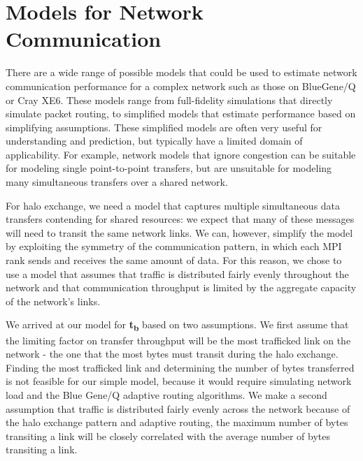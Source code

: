 \documentclass{acm_proc_article-sp}
\begin{document}
\section{Models for Network Communication}\label{model}


There are a wide range of possible models that could be used to
estimate network communication performance for a complex network
such as those on BlueGene/Q or Cray XE6.  These models range from
full-fidelity simulations that directly simulate packet routing, to
simplified models that estimate performance based on simplifying
assumptions.  These simplified models are often very useful for
understanding and prediction, but typically have a limited domain
of applicability.  For example, network models that ignore congestion
can be suitable for modeling single point-to-point transfers, but are
unsuitable for modeling many simultaneous transfers over a shared network.

For halo exchange, we need a model that captures multiple
simultaneous data transfers contending for shared resources: we
expect that many of these messages will need to transit the
same network links.  We can, however, simplify the model by exploiting the
symmetry of the communication pattern, in which each MPI rank sends
and receives the same amount of data. For this reason, we chose to
use a model that assumes that traffic is distributed fairly evenly
throughout the network and that communication throughput is limited
by the aggregate capacity of the network's links. 

We arrived at our model for \textbf{t\textsubscript{b}} based on two assumptions.
We first assume that the limiting factor on transfer throughput will be
the most trafficked link on the network - the one that the most bytes
must transit during the halo exchange.  Finding the most trafficked
link and determining the number of bytes transferred is not feasible for our
simple model, because it would require simulating network load and
the Blue Gene/Q adaptive routing algorithms. We make a second assumption
that traffic is distributed fairly evenly across the network because of
the halo exchange pattern and adaptive routing, the maximum number of bytes
transiting a link will be closely correlated with the average number of bytes transiting a link.
\end{document}
